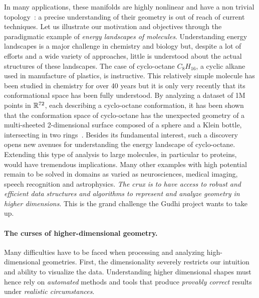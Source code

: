 In many applications, these manifolds are highly nonlinear and have a non trivial topology~:
a precise understanding of their geometry is out of reach of current techniques.
Let us illustrate our motivation and objectives through the paradigmatic example of {\em energy landscapes of molecules}. Understanding  energy landscapes is a major challenge in chemistry and biology but,  despite a lot of efforts and a wide variety of approaches, little is understood about the actual structures of these landscapes. The case of cyclo-octane $C_8H_{16}$, a cyclic alkane used in manufacture of plastics, is instructive. This relatively simple molecule has been studied in chemistry for over 40 years but it is only very recently that its conformational space has been fully understood. By analyzing a dataset of 1M points in $\mathbb R^{72}$, each describing a cyclo-octane conformation, it has been shown that the conformation space of cyclo-octane has the unexpected geometry of  a multi-sheeted 2-dimensional surface composed of a sphere and a Klein bottle, intersecting in two rings~\cite{mtcw-tco-2010}.  Besides its fundamental interest, such a discovery opens new avenues for understanding the energy landscape of cyclo-octane. Extending this type of analysis to large molecules, in particular to proteins, would have tremendous implications. Many other examples with high potential remain to be solved in domains as varied as neurosciences, medical imaging, speech recognition and astrophysics. {\em The crux is to have access to robust and efficient data structures and algorithms to represent and analyze geometry in higher dimensions}. This is the grand challenge the Gudhi project wants to take up.

\vspace{-1mm}

\paragraph{The curses of higher-dimensional geometry.} 
Many difficulties have to be faced when processing and analyzing
high-dimensional geometries. First, the dimensionality severely restricts our intuition and ability to visualize the data.  Understanding higher dimensional shapes must hence rely on {\em automated} methods and tools that produce {\em provably correct} results under {\em realistic circumstances}.


